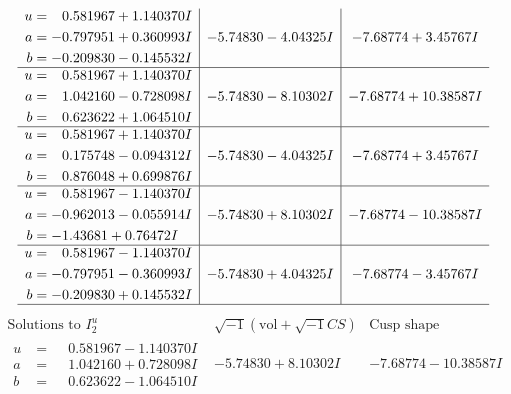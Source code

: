 \documentclass[1p]{elsarticle_modified}
\theoremstyle{definition}
\newcommand{\I}{\sqrt{-1}}
\begin{document}
$$\begin{array}{c|c|c}
\begin{aligned}
u &= \phantom{-}0.581967 + 1.140370 I \\
a &= -0.797951 + 0.360993 I \\
b &= -0.209830 - 0.145532 I\end{aligned}
 & -5.74830 - 4.04325 I & -7.68774 + 3.45767 I \\ \hline\begin{aligned}
u &= \phantom{-}0.581967 + 1.140370 I \\
a &= \phantom{-}1.042160 - 0.728098 I \\
b &= \phantom{-}0.623622 + 1.064510 I\end{aligned}
 & -5.74830 - 8.10302 I & -7.68774 + 10.38587 I \\ \hline\begin{aligned}
u &= \phantom{-}0.581967 + 1.140370 I \\
a &= \phantom{-}0.175748 - 0.094312 I \\
b &= \phantom{-}0.876048 + 0.699876 I\end{aligned}
 & -5.74830 - 4.04325 I & -7.68774 + 3.45767 I \\ \hline\begin{aligned}
u &= \phantom{-}0.581967 - 1.140370 I \\
a &= -0.962013 - 0.055914 I \\
b &= -1.43681 + 0.76472 I\end{aligned}
 & -5.74830 + 8.10302 I & -7.68774 - 10.38587 I \\ \hline\begin{aligned}
u &= \phantom{-}0.581967 - 1.140370 I \\
a &= -0.797951 - 0.360993 I \\
b &= -0.209830 + 0.145532 I\end{aligned}
 & -5.74830 + 4.04325 I & -7.68774 - 3.45767 I\\
 \hline 
 \end{array}$$\newpage$$\begin{array}{c|c|c}  
\text{Solutions to }I^u_{2}& \I (\text{vol} + \sqrt{-1}CS) & \text{Cusp shape}\\
 \hline 
\begin{aligned}
u &= \phantom{-}0.581967 - 1.140370 I \\
a &= \phantom{-}1.042160 + 0.728098 I \\
b &= \phantom{-}0.623622 - 1.064510 I\end{aligned}
 & -5.74830 + 8.10302 I & -7.68774 - 10.38587 I \\ \hline\begin{aligned}

\end{aligned}
\end{array}$$
\end{document}
